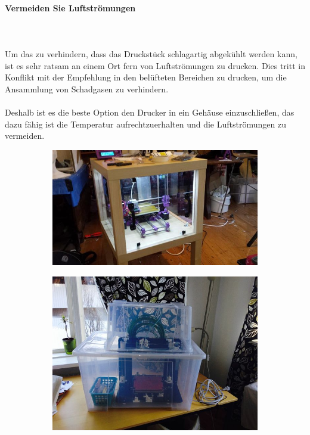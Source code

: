 \documentclass[11pt,a4paper]{article}
\begin{document}
			\paragraph{Vermeiden Sie Luftströmungen}\mbox{}\\\\
Um das zu verhindern, dass das Druckstück schlagartig abgekühlt werden kann, ist es sehr ratsam an einem Ort fern von Luftströmungen zu drucken. Dies tritt in Konflikt mit der Empfehlung in den belüfteten Bereichen zu drucken, um die Ansammlung von Schadgasen zu verhindern.
\\\\
Deshalb ist es die beste Option den Drucker in ein Gehäuse einzuschließen, das dazu fähig ist die Temperatur aufrechtzuerhalten und die Luftströmungen zu vermeiden.
\begin{figure}[H]
    \centering
    \begin{subfigure}[b]{0.3\textwidth}
        \includegraphics[width=\textwidth,cfbox=azul_marcos 4pt 0pt]{FOTOS/CERRAMIENTO1}
    \end{subfigure}
    \quad %
    \begin{subfigure}[b]{0.3\textwidth}
        \includegraphics[width=\textwidth,cfbox=azul_marcos 4pt 0pt]{FOTOS/CERRAMIENTO2}

\end{subfigure}
\end{figure}
\end{document}

